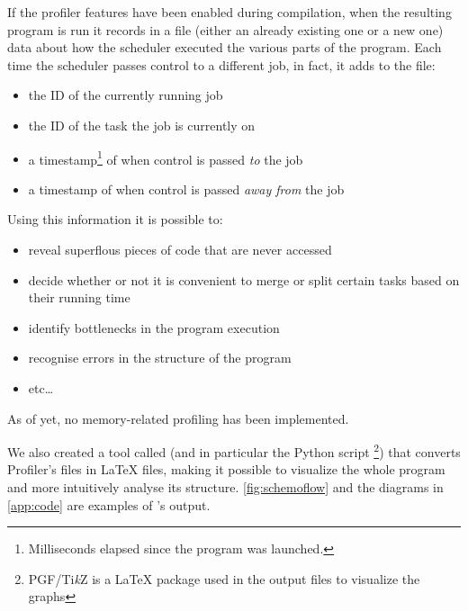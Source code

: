   If the profiler features have been enabled during compilation, when
  the resulting program is run it records in a  file
  (either an already existing one or a new one) data about how
  the scheduler executed the various parts of the program.
  Each time the scheduler passes control to a different job, in fact, it
  adds to the file:
  \begin{itemize}
    \item the ID of the currently running job
    \item the ID of the task the job is currently on
    \item a timestamp\footnote{\label{clock_note}Milliseconds elapsed
    since the program was launched.} of when control is passed
    \textit{to} the job
    \item a timestamp of when control is passed
    \textit{away from} the job
  \end{itemize}

  Using this information it is possible to:
  \begin{itemize}
    \item reveal superflous pieces of code that are never accessed
    \item decide whether or not it is convenient to merge or split
    certain tasks based on their running time
    \item identify bottlenecks in the program execution
    \item recognise errors in the structure of the program
    \item etc\ldots
  \end{itemize}
  
  As of yet, no memory-related profiling has been implemented.

  We also created a tool called \ScheMoTeX{} (and in particular the
  Python script \footnote{PGF/Ti\textit{k}Z is a
  \LaTeX{} package used in the output files to visualize the graphs})
  that converts \ScheMo{} Profiler's  files in \LaTeX{}
   files, making it possible to visualize the whole program
  and more intuitively analyse its structure. \autoref{fig:schemoflow}
  and the diagrams in \autoref{app:code} are examples of
  \ScheMoTeX{}'s output.
